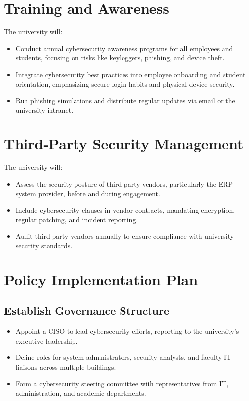 \documentclass[11pt]{article}
\begin{document}
\section{Training and Awareness}
The university will:
\begin{itemize}
    \item Conduct annual cybersecurity awareness programs for all employees and students, focusing on risks like keyloggers, phishing, and device theft.
    \item Integrate cybersecurity best practices into employee onboarding and student orientation, emphasizing secure login habits and physical device security.
    \item Run phishing simulations and distribute regular updates via email or the university intranet.
\end{itemize}

\section{Third-Party Security Management}
The university will:
\begin{itemize}
    \item Assess the security posture of third-party vendors, particularly the ERP system provider, before and during engagement.
    \item Include cybersecurity clauses in vendor contracts, mandating encryption, regular patching, and incident reporting.
    \item Audit third-party vendors annually to ensure compliance with university security standards.
\end{itemize}

\section{Policy Implementation Plan}

\subsection{Establish Governance Structure}
\begin{itemize}
    \item Appoint a CISO to lead cybersecurity efforts, reporting to the university’s executive leadership.
    \item Define roles for system administrators, security analysts, and faculty IT liaisons across multiple buildings.
    \item Form a cybersecurity steering committee with representatives from IT, administration, and academic departments.
\end{itemize}
\end{document}
